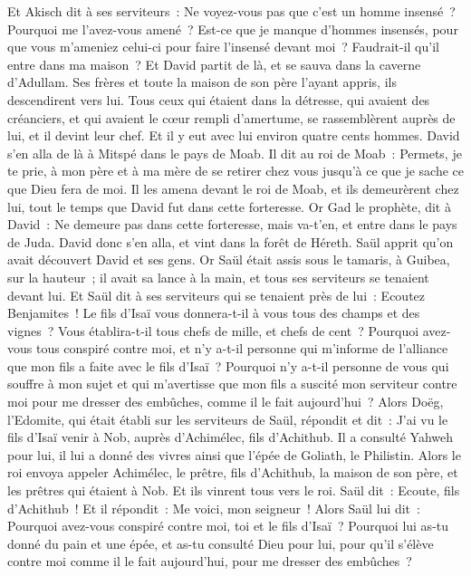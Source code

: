 \begin{multicols}{2}
Et Akisch dit à ses serviteurs~: Ne voyez-vous pas que c'est un homme insensé~? Pourquoi me l'avez-vous amené~?
Est-ce que je manque d'hommes insensés, pour que vous m'ameniez celui-ci pour faire l'insensé devant moi~? Faudrait-il qu'il entre dans ma maison~?
\VerseOne{}Et David partit de là, et se sauva dans la caverne d'Adullam. Ses frères et toute la maison de son père l'ayant appris, ils descendirent vers lui.
Tous ceux qui étaient dans la détresse, qui avaient des créanciers, et qui avaient le cœur rempli d'amertume, se rassemblèrent auprès de lui, et il devint leur chef. Et il y eut avec lui environ quatre cents hommes.
David s'en alla de là à Mitspé dans le pays de Moab. Il dit au roi de Moab~: Permets, je te prie, à mon père et à ma mère de se retirer chez vous jusqu'à ce que je sache ce que Dieu fera de moi.
Il les amena devant le roi de Moab, et ils demeurèrent chez lui, tout le temps que David fut dans cette forteresse.
Or Gad le prophète, dit à David~: Ne demeure pas dans cette forteresse, mais va-t'en, et entre dans le pays de Juda. David donc s'en alla, et vint dans la forêt de Héreth.
Saül apprit qu'on avait découvert David et ses gens. Or Saül était assis sous le tamaris, à Guibea, sur la hauteur~; il avait sa lance à la main, et tous ses serviteurs se tenaient devant lui.
Et Saül dit à ses serviteurs qui se tenaient près de lui~: Ecoutez Benjamites~! Le fils d'Isaï vous donnera-t-il à vous tous des champs et des vignes~? Vous établira-t-il tous chefs de mille, et chefs de cent~?
Pourquoi avez-vous tous conspiré contre moi, et n'y a-t-il personne qui m'informe de l'alliance que mon fils a faite avec le fils d'Isaï~? Pourquoi n'y a-t-il personne de vous qui souffre à mon sujet et qui m'avertisse que mon fils a suscité mon serviteur contre moi pour me dresser des embûches, comme il le fait aujourd'hui~?
Alors Doëg, l'Edomite, qui était établi sur les serviteurs de Saül, répondit et dit~: J'ai vu le fils d'Isaï venir à Nob, auprès d'Achimélec, fils d'Achithub.
Il a consulté Yahweh pour lui, il lui a donné des vivres ainsi que l'épée de Goliath, le Philistin.
Alors le roi envoya appeler Achimélec, le prêtre, fils d'Achithub, la maison de son père, et les prêtres qui étaient à Nob. Et ils vinrent tous vers le roi.
Saül dit~: Ecoute, fils d'Achithub~! Et il répondit~: Me voici, mon seigneur~!
Alors Saül lui dit~: Pourquoi avez-vous conspiré contre moi, toi et le fils d'Isaï~? Pourquoi lui as-tu donné du pain et une épée, et as-tu consulté Dieu pour lui, pour qu'il s'élève contre moi comme il le fait aujourd'hui, pour me dresser des embûches~?

\end{multicols}
